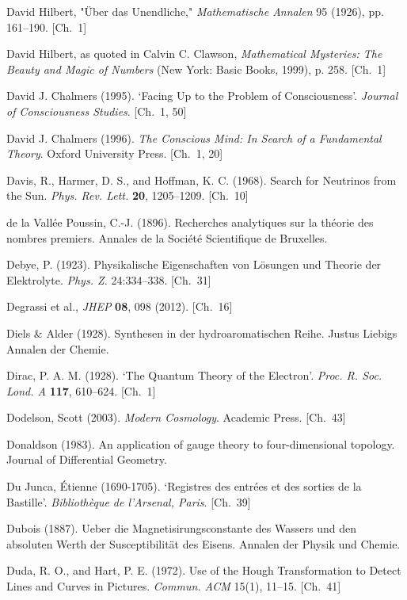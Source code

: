 \begin{list}{}{%
  \setlength{\leftmargin}{2em}%
  \setlength{\itemindent}{-2em}%
  \setlength{\itemsep}{0.35\baselineskip}%
  \setlength{\parsep}{0pt}%
  \setlength{\topsep}{0.5em}}
\item David Hilbert, "Über das Unendliche," \textit{Mathematische Annalen} 95 (1926), pp. 161–190. \hfill {\scriptsize [Ch.~1]}
\item David Hilbert, as quoted in Calvin C. Clawson, \textit{Mathematical Mysteries: The Beauty and Magic of Numbers} (New York: Basic Books, 1999), p. 258. \hfill {\scriptsize [Ch.~1]}
\item David J. Chalmers (1995). `Facing Up to the Problem of Consciousness'. \textit{Journal of Consciousness Studies}. \hfill {\scriptsize [Ch.~1, 50]}
\item David J. Chalmers (1996). \textit{The Conscious Mind: In Search of a Fundamental Theory}. Oxford University Press. \hfill {\scriptsize [Ch.~1, 20]}
\item Davis, R., Harmer, D. S., and Hoffman, K. C. (1968). Search for Neutrinos from the Sun. \textit{Phys. Rev. Lett.} \textbf{20}, 1205–1209. \hfill {\scriptsize [Ch.~10]}
\item de la Vall\'ee Poussin, C.-J. (1896). Recherches analytiques sur la th\'eorie des nombres premiers. Annales de la Soci\'et\'e Scientifique de Bruxelles.
\item Debye, P. (1923). Physikalische Eigenschaften von Lösungen und Theorie der Elektrolyte. \textit{Phys. Z.} 24:334–338. \hfill {\scriptsize [Ch.~31]}
\item Degrassi et al., \textit{JHEP} \textbf{08}, 098 (2012). \hfill {\scriptsize [Ch.~16]}
\item Diels \& Alder (1928). Synthesen in der hydroaromatischen Reihe. Justus Liebigs Annalen der Chemie.
\item Dirac, P. A. M. (1928). `The Quantum Theory of the Electron'. \textit{Proc. R. Soc. Lond. A} \textbf{117}, 610–624. \hfill {\scriptsize [Ch.~1]}
\item Dodelson, Scott (2003). \textit{Modern Cosmology}. Academic Press. \hfill {\scriptsize [Ch.~43]}
\item Donaldson (1983). An application of gauge theory to four-dimensional topology. Journal of Differential Geometry.
\item Du Junca, Étienne (1690-1705). `Registres des entrées et des sorties de la Bastille'. \textit{Bibliothèque de l'Arsenal, Paris}. \hfill {\scriptsize [Ch.~39]}
\item Dubois (1887). Ueber die Magnetisirungsconstante des Wassers und den absoluten Werth der Susceptibilität des Eisens. Annalen der Physik und Chemie.
\item Duda, R. O., and Hart, P. E. (1972). Use of the Hough Transformation to Detect Lines and Curves in Pictures. \textit{Commun. ACM} 15(1), 11–15. \hfill {\scriptsize [Ch.~41]}

\end{list}
